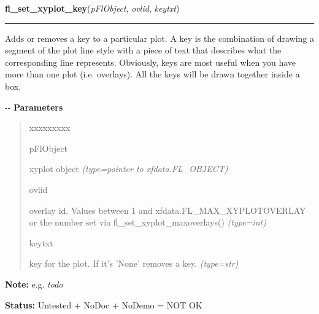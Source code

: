 \hspace{.8\funcindent}\begin{boxedminipage}{\funcwidth}

    \raggedright \textbf{fl\_set\_xyplot\_key}(\textit{pFlObject}, \textit{ovlid}, \textit{keytxt})

    \vspace{-1.5ex}

    \rule{\textwidth}{0.5\fboxrule}
\setlength{\parskip}{2ex}

Adds or removes a key to a particular plot. A key is the combination
of drawing a segment of the plot line style with a piece of text that
describes what the corresponding line represents. Obviously, keys are
most useful when you have more than one plot (i.e. overlays). All the
keys will be drawn together inside a box.

-{}-
\setlength{\parskip}{1ex}
      \textbf{Parameters}
      \vspace{-1ex}

      \begin{quote}
        \begin{Ventry}{xxxxxxxxx}

          \item[pFlObject]


xyplot object
            {\it (type=pointer to xfdata.FL\_OBJECT)}

          \item[ovlid]


overlay id. Values between 1 and xfdata.FL\_MAX\_XYPLOTOVERLAY or the
number set via fl\_set\_xyplot\_maxoverlays()
            {\it (type=int)}

          \item[keytxt]


key for the plot. If it's 'None' removes a key.
            {\it (type=str)}

        \end{Ventry}

      \end{quote}

\textbf{Note:} 
e.g. \emph{todo}


\textbf{Status:} 
Untested + NoDoc + NoDemo = NOT OK


    \end{boxedminipage}

    \label{xformslib:flxyplot:fl_set_xyplot_key_position}

